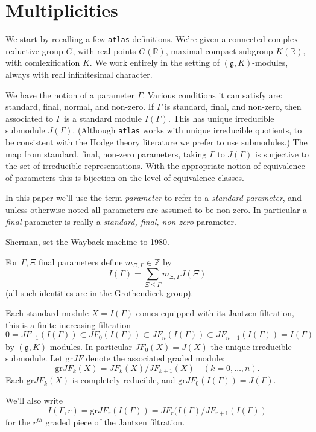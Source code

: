 \documentclass[12pt,leqno]{article}
\newcommand{\grjf}{\text{gr}JF}
\newcommand{\R}{\mathbb R}
\newcommand{\Z}{\mathbb Z}
\renewcommand{\sec}[1]{\section{#1}
\renewcommand{\theequation}{\thesection.\arabic{equation}}
  \setcounter{equation}{0}}
\newcommand{\g}{\mathfrak g}
\renewcommand{\sec}[1]{\section{#1}
\renewcommand{\theequation}{\thesection.\arabic{equation}}
  \setcounter{equation}{0}}
\begin{document}
\sec{Multiplicities}
\label{s:mult}


We start by recalling a few {\tt atlas} definitions. We're given a
connected complex reductive group $G$, with real points $G(\R)$,
maximal compact subgroup $K(\R)$, with comlexification $K$.
We work entirely in the setting of $(\g,K)$-modules, always with real
infinitesimal character.

We have the
notion of a parameter $\Gamma$. Various conditions it can satisfy are:
standard, final, normal, and non-zero. If $\Gamma$ is standard, final,
and non-zero, then associated to $\Gamma$ is a standard module
$I(\Gamma)$. This has unique irreducible submodule
$J(\Gamma)$. (Although {\tt atlas} works with unique irreducible
quotients, to be consistent with the Hodge theory literature we prefer
to use submodules.) The map from standard, final, non-zero
parameters, taking $\Gamma$ to $J(\Gamma)$ is surjective to the set of
irreducible representations. With the appropriate notion of
equivalence of parameters this is bijection on the level of
equivalence classes.

In this paper we'll use the term {\it parameter} to refer to a {\it
  standard parameter}, and unless otherwise noted all parameters are
assumed to be non-zero. In particular a {\it final} parameter is really a  {\it standard, final, non-zero} parameter.

\medskip

Sherman, set the Wayback machine to 1980.

For $\Gamma,\Xi$ final parameters define $m_{\Xi,\Gamma}\in\Z$ by
$$
I(\Gamma)=\sum_{\Xi\le\Gamma} m_{\Xi,\Gamma}J(\Xi)
$$
(all such identities are in the Grothendieck group).

Each standard module $X=I(\Gamma)$ comes equipped with its Jantzen filtration, this is a finite
increasing filtration
\begin{equation}
0=JF_{-1}(I(\Gamma))\subset JF_0(I(\Gamma))\subset JF_n(I(\Gamma))\subset JF_{n+1}(I(\Gamma))=I(\Gamma)
\end{equation}
by $(\g,K)$-modules. In particular $JF_0(X)=J(X)$  the unique irreducible submodule.
Let $\grjf$ denote the associated graded module:
\begin{equation}
\grjf_k(X)=JF_k(X)/JF_{k+1}(X) \quad(k=0,\dots, n).
\end{equation}
Each $\grjf_k(X)$ is completely reducible, and  $\grjf_0(I(\Gamma))=J(\Gamma)$.

We'll also write
$$
I(\Gamma,r)=\grjf_r(I(\Gamma))=JF_r(I(\Gamma)/JF_{r+1}(I(\Gamma))
$$
for the $r^{th}$ graded piece of the Jantzen filtration.
\end{document}
